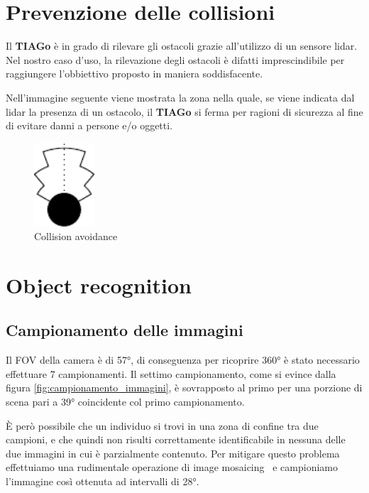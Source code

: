 \documentclass[a4paper]{article}
\begin{document}
	
	\section{Prevenzione delle collisioni}\label{sec:Rilevamento-delle-collisioni} 
	Il \textbf{TIAGo} è in grado di rilevare gli ostacoli grazie all'utilizzo di un sensore lidar. Nel nostro caso d'uso, la rilevazione degli ostacoli è difatti imprescindibile per raggiungere l'obbiettivo proposto in maniera soddisfacente. 
	
	Nell'immagine seguente viene mostrata la zona nella quale, se viene indicata dal lidar la presenza di un ostacolo, il \textbf{TIAGo} si ferma per ragioni di sicurezza al fine di evitare danni a persone e/o oggetti.
	\begin{figure}[H]
		\centering
		\includegraphics[width=0.2\textwidth]{./img/collision_avoidance.pdf}
		\caption{Collision avoidance}
		\label{fig:collision_avoidance}
	\end{figure}
	
	\section{Object recognition}\label{sec:Object-recognition}
	
	\subsection{Campionamento delle immagini}\label{subsec:Campionamento-delle-immagini}
	Il FOV della camera è di 57°, di conseguenza per ricoprire 360° è stato
	necessario effettuare 7 campionamenti. Il settimo campionamento, come si
	evince dalla figura \ref{fig:campionamento_immagini}, è sovrapposto al
	primo per una porzione di scena pari a 39° coincidente col primo
	campionamento.

	È però possibile che un individuo si trovi in una zona di confine tra due
	campioni, e che quindi non risulti correttamente identificabile in nessuna
	delle due immagini in cui è parzialmente contenuto. Per mitigare questo
	problema effettuiamo una rudimentale operazione di image
	mosaicing~\cite{ghosh2016survey} e campioniamo l'immagine così ottenuta
	ad intervalli di 28°.
	
\end{document}
